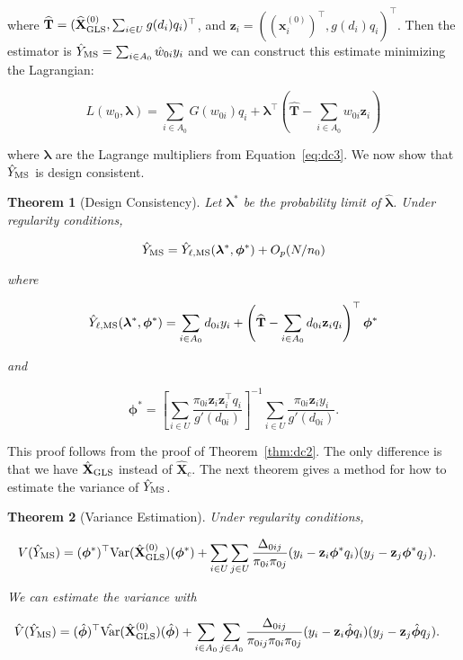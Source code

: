 \documentclass[12pt]{article}
\newtheorem{theorem}{Theorem}
\newcommand{\Var}{{\text{Var}}}
\renewcommand{\bf}[1]{\mathbf{#1}}
\begin{document}
where $\widehat{\bf{T}} = (\widehat{\bf X}_{\rm{GLS}}^{(0)},
\sum_{i \in U} g(d_i) q_i)^\top$,
and $\bf z_i = ((\bf x_i^{(0)})^\top, g(d_i)q_i)^\top$. Then
the estimator is $\hat Y_{\rm MS} = \sum_{i \in A_0} \hat w_{0i} y_i$ and we can
construct this estimate minimizing the Lagrangian:

$$
L(w_{0}, \bm \lambda) = \sum_{i \in A_0} G(w_{0i}) q_i + {\bm \lambda}^\top
\left(\widehat{\bf{T}} - \sum_{i \in A_0} w_{0i} \bf z_i\right)
$$

where $\bm \lambda$ are the Lagrange multipliers from Equation~\ref{eq:dc3}.
We now show that $\hat Y_{\rm MS}$ is design consistent.

\begin{theorem}[Design Consistency]
  Let $\bm \lambda^*$ be the probability limit of $\hat{\bm \lambda}$.
  Under regularity conditions,

  $$
  \hat Y_{\rm MS} = \hat Y_{\ell, \rm MS}(\bm \lambda^*, \bm \phi^*) + O_p(N / n_0)
  $$

  where

  $$
  \hat Y_{\ell, \rm MS}(\bm \lambda^*, \bm \phi^*) = 
  \sum_{i \in A_0} d_{0i} y_i + \left(
    \widehat{\bf T} - \sum_{i \in A_0} d_{0i} \bf z_i q_i
  \right)^\top \bm \phi^*
  $$

  and 

  $$
  \bm \phi^* = 
  \left[\sum_{i \in U} \frac{\pi_{0i} \bf z_i \bf z_i^\top q_i}{g'(d_{0i})}\right]^{-1}
  \sum_{i \in U} \frac{\pi_{0i} \bf z_i y_i}{g'(d_{0i})}.
  $$
\end{theorem}

This proof follows from the proof of Theorem~\ref{thm:dc2}. The only
difference is that we have $\hat{\bf X}_{\rm GLS}$ instead of $\hat{\bf X}_c$.
The next theorem gives a method for how to estimate the variance of 
$\hat Y_{\rm MS}$.

\begin{theorem}[Variance Estimation]
  Under regularity conditions,

  $$
  \begin{aligned}
    V(\hat Y_{\rm MS}) 
    &= (\bm \phi^{*})^\top \Var(\hat{\bf X}_{\rm GLS}^{(0)}) (\bm \phi^{*}) + 
      \sum_{i \in U} \sum_{j \in U} \frac{\Delta_{0ij}}{\pi_{0i}\pi_{0j}}
      (y_i - \bf z_i\bm \phi^{*}q_i)
      (y_j - \bf z_j\bm \phi^{*}q_j). 
  \end{aligned}
  $$

  We can estimate the variance with

  $$
  \begin{aligned}
    \hat V(\hat Y_{\rm MS}) 
    &= (\hat{\bm \phi})^\top \hat \Var(\hat{\bf X}_{\rm GLS}^{(0)}) (\hat{\bm \phi})
    + \sum_{i \in A_0} \sum_{j \in A_0} \frac{\Delta_{0ij}}{\pi_{0ij}\pi_{0i}\pi_{0j}}
      (y_i - \bf z_i \hat{\bm \phi}q_i)
      (y_j - \bf z_j \hat{\bm \phi}q_j). 
  \end{aligned}
  $$

\end{theorem}
\end{document}
